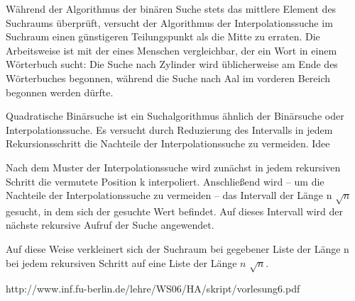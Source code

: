 \documentclass{lehramt-informatik-aufgabe}
\begin{document}
\begin{enumerate}
\begin{liAntwort}
\begin{liExkurs}[Interpolationssuche]
Während der Algorithmus der binären Suche stets das mittlere Element des
Suchraums überprüft, versucht der Algorithmus der Interpolationssuche im
Suchraum einen günstigeren Teilungspunkt als die Mitte zu erraten. Die
Arbeitsweise ist mit der eines Menschen vergleichbar, der ein Wort in
einem Wörterbuch sucht: Die Suche nach Zylinder wird üblicherweise am
Ende des Wörterbuches begonnen, während die Suche nach Aal im vorderen
Bereich begonnen werden dürfte.
\end{liExkurs}

\begin{liExkurs}
Quadratische Binärsuche ist ein Suchalgorithmus ähnlich der Binärsuche
oder Interpolationssuche. Es versucht durch Reduzierung des Intervalls
in jedem Rekursionsschritt die Nachteile der Interpolationssuche zu
vermeiden. Idee

Nach dem Muster der Interpolationssuche wird zunächst in jedem
rekursiven Schritt die vermutete Position k interpoliert. Anschließend
wird – um die Nachteile der Interpolationssuche zu vermeiden – das
Intervall der Länge n $\sqrt{n}$ gesucht, in
dem sich der gesuchte Wert befindet. Auf dieses Intervall wird der
nächste rekursive Aufruf der Suche angewendet.

Auf diese Weise verkleinert sich der Suchraum bei gegebener Liste der
Länge n bei jedem rekursiven Schritt auf eine Liste der Länge $n$
$\sqrt n$.
\end{liExkurs}

http://www.inf.fu-berlin.de/lehre/WS06/HA/skript/vorlesung6.pdf

\end{liAntwort}

\end{enumerate}
\end{document}
